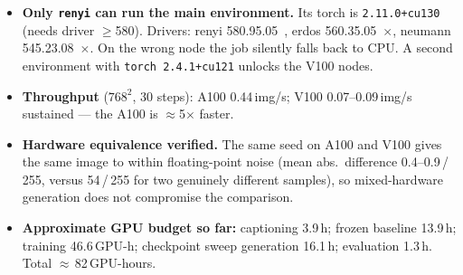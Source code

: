 \documentclass[11pt,a4paper]{article}
\begin{document}
\begin{itemize}
\item \textbf{Only \texttt{renyi} can run the main environment.} Its torch is
\texttt{2.11.0+cu130} (needs driver $\geq$580). Drivers: renyi 580.95.05~\checkmark,
erdos 560.35.05~$\times$, neumann 545.23.08~$\times$. On the wrong node the job
silently falls back to CPU. A second environment with \texttt{torch 2.4.1+cu121}
unlocks the V100 nodes.
\item \textbf{Throughput} ($768^2$, 30 steps): A100 0.44\,img/s; V100
0.07--0.09\,img/s sustained --- the A100 is $\approx$5$\times$ faster.
\item \textbf{Hardware equivalence verified.} The same seed on A100 and V100
gives the same image to within floating-point noise (mean abs.\ difference
0.4--0.9\,/\,255, versus 54\,/\,255 for two genuinely different samples), so
mixed-hardware generation does not compromise the comparison.
\item \textbf{Approximate GPU budget so far:} captioning 3.9\,h; frozen baseline
13.9\,h; training 46.6\,GPU-h; checkpoint sweep generation 16.1\,h; evaluation
1.3\,h. Total $\approx$\,82\,GPU-hours.
\end{itemize}
\end{document}
